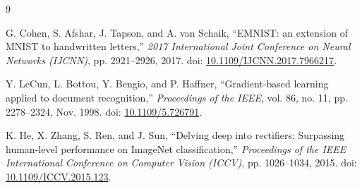 \documentclass[a4paper,12pt]{extreport}
\begin{document}
\begin{thebibliography}{9}
G. Cohen, S. Afshar, J. Tapson, and A. van Schaik,
``EMNIST: an extension of MNIST to handwritten letters,''
\textit{2017 International Joint Conference on Neural Networks (IJCNN)}, pp. 2921--2926, 2017.
doi: \href{https://doi.org/10.1109/IJCNN.2017.7966217}{10.1109/IJCNN.2017.7966217}.

Y. LeCun, L. Bottou, Y. Bengio, and P. Haffner,
``Gradient-based learning applied to document recognition,''
\textit{Proceedings of the IEEE}, vol. 86, no. 11, pp. 2278--2324, Nov. 1998.
doi: \href{https://doi.org/10.1109/5.726791}{10.1109/5.726791}.

K. He, X. Zhang, S. Ren, and J. Sun,
``Delving deep into rectifiers: Surpassing human-level performance on ImageNet classification,''
\textit{Proceedings of the IEEE International Conference on Computer Vision (ICCV)}, pp. 1026--1034, 2015.
doi: \href{https://doi.org/10.1109/ICCV.2015.123}{10.1109/ICCV.2015.123}.
\end{thebibliography}
\end{document}
